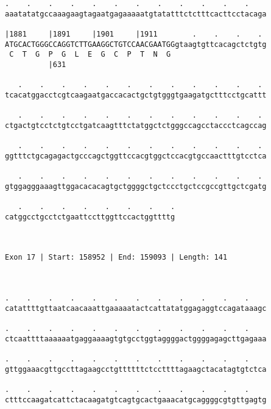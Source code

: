 \documentclass{article}
\begin{document}
\begin{Verbatim}
.    .    .    .    .    .    .    .    .    .    .    .    
aaatatatgccaaagaagtagaatgagaaaaatgtatatttctctttcacttcctacaga
                                                            
|1881     |1891     |1901     |1911        .    .    .    . 
ATGCACTGGGCCAGGTCTTGAAGGCTGTCCAACGAATGGgtaagtgttcacagctctgtg
 C  T  G  P  G  L  E  G  C  P  T  N  G                      
          |631                                              
  
   .    .    .    .    .    .    .    .    .    .    .    . 
tcacatggacctcgtcaagaatgaccacactgctgtgggtgaagatgctttcctgcattt
                                                            
   .    .    .    .    .    .    .    .    .    .    .    . 
ctgactgtcctctgtcctgatcaagtttctatggctctgggccagcctaccctcagccag
                                                            
   .    .    .    .    .    .    .    .    .    .    .    . 
ggtttctgcagagactgcccagctggttccacgtggctccacgtgccaactttgtcctca
                                                            
   .    .    .    .    .    .    .    .    .    .    .    . 
gtggagggaaagttggacacacagtgctggggctgctccctgctccgccgttgctcgatg
                                                            
   .    .    .    .    .    .    .    .
catggcctgcctctgaattccttggttccactggttttg
                                       
                                       
 
Exon 17 | Start: 158952 | End: 159093 | Length: 141



.    .    .    .    .    .    .    .    .    .    .    .    
catattttgttaatcaacaaattgaaaaatactcattatatggagaggtccagataaagc
                                                            
.    .    .    .    .    .    .    .    .    .    .    .    
ctcaattttaaaaaatgaggaaaagtgtgcctggtaggggactggggagagcttgagaaa
                                                            
.    .    .    .    .    .    .    .    .    .    .    .    
gttggaaacgttgccttagaagcctgttttttctccttttagaagctacatagtgtctca
                                                            
.    .    .    .    .    .    .    .    .    .    .    .    
ctttccaagatcattctacaagatgtcagtgcactgaaacatgcaggggcgtgttgagtg
                                                            

\end{Verbatim}
\end{document}

